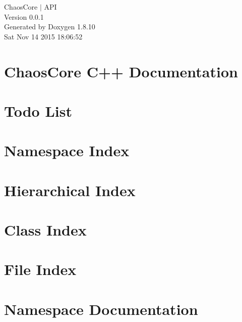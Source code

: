 \documentclass[twoside]{book}
\newcommand{\+}{\discretionary{\mbox{\scriptsize$\hookleftarrow$}}{}{}}
\newcommand{\clearemptydoublepage}{%
  \newpage{\pagestyle{empty}\cleardoublepage}%
}
\begin{document}
\hypersetup{pageanchor=false,
             bookmarks=true,
             bookmarksnumbered=true,
             pdfencoding=unicode
            }
\begin{titlepage}
\vspace*{7cm}
\begin{center}%
{\Large Chaos\+Core $\vert$ A\+P\+I \\[1ex]\large Version 0.\+0.\+1 }\\
\vspace*{1cm}
{\large Generated by Doxygen 1.8.10}\\
\vspace*{0.5cm}
{\small Sat Nov 14 2015 18:06:52}\\
\end{center}
\end{titlepage}
\clearemptydoublepage
\tableofcontents
\clearemptydoublepage
{}
\hypersetup{pageanchor=true}

\chapter{Chaos\+Core C++ Documentation}
\label{index}\hypertarget{index}{}
\chapter{Todo List}
\label{todo}
\hypertarget{todo}{}

\chapter{Namespace Index}

\chapter{Hierarchical Index}

\chapter{Class Index}

\chapter{File Index}

\chapter{Namespace Documentation}












\end{document}
